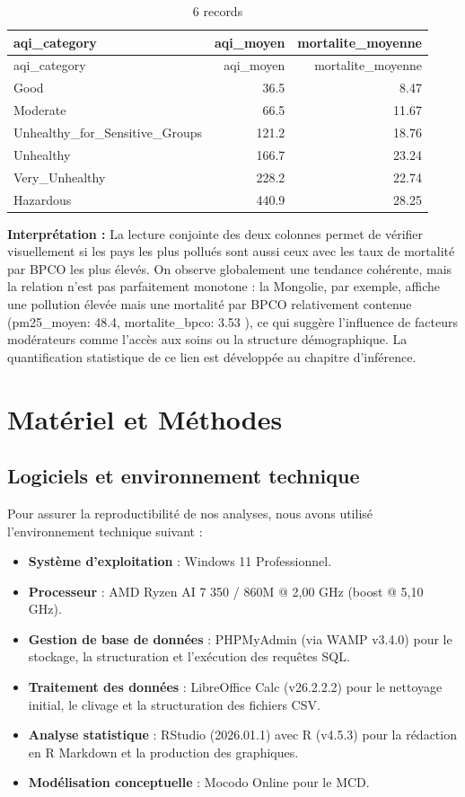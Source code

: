 \documentclass[mstat,12pt]{unswthesis}
\begin{document}
\begin{longtable}[]{@{}lrr@{}}
\caption{6 records}\tabularnewline
\toprule\noalign{}
aqi\_category & aqi\_moyen & mortalite\_moyenne \\
\midrule\noalign{}
\endfirsthead
\toprule\noalign{}
aqi\_category & aqi\_moyen & mortalite\_moyenne \\
\midrule\noalign{}
\endhead
\bottomrule\noalign{}
\endlastfoot
Good & 36.5 & 8.47 \\
Moderate & 66.5 & 11.67 \\
Unhealthy\_for\_Sensitive\_Groups & 121.2 & 18.76 \\
Unhealthy & 166.7 & 23.24 \\
Very\_Unhealthy & 228.2 & 22.74 \\
Hazardous & 440.9 & 28.25 \\
\end{longtable}

\textbf{Interprétation :} La lecture conjointe des deux colonnes permet
de vérifier visuellement si les pays les plus pollués sont aussi ceux
avec les taux de mortalité par BPCO les plus élevés. On observe
globalement une tendance cohérente, mais la relation n'est pas
parfaitement monotone : la Mongolie, par exemple, affiche une pollution
élevée mais une mortalité par BPCO relativement contenue (pm25\_moyen:
48.4, mortalite\_bpco: 3.53 ), ce qui suggère l'influence de facteurs
modérateurs comme l'accès aux soins ou la structure démographique. La
quantification statistique de ce lien est développée au chapitre
d'inférence.

\chapter{Matériel et Méthodes}\label{matuxe9riel-et-muxe9thodes}

\section{Logiciels et environnement
technique}\label{logiciels-et-environnement-technique}

Pour assurer la reproductibilité de nos analyses, nous avons utilisé
l'environnement technique suivant :

\begin{itemize}
\item
  \textbf{Système d'exploitation} : Windows 11 Professionnel.
\item
  \textbf{Processeur} : AMD Ryzen AI 7 350 / 860M @ 2,00 GHz (boost @
  5,10 GHz).
\item
  \textbf{Gestion de base de données} : PHPMyAdmin (via WAMP v3.4.0)
  pour le stockage, la structuration et l'exécution des requêtes SQL.
\item
  \textbf{Traitement des données} : LibreOffice Calc (v26.2.2.2) pour le
  nettoyage initial, le clivage et la structuration des fichiers CSV.
\item
  \textbf{Analyse statistique} : RStudio (2026.01.1) avec R (v4.5.3)
  pour la rédaction en R Markdown et la production des graphiques.
\item
  \textbf{Modélisation conceptuelle} : Mocodo Online pour le MCD.
\end{itemize}
\end{document}
